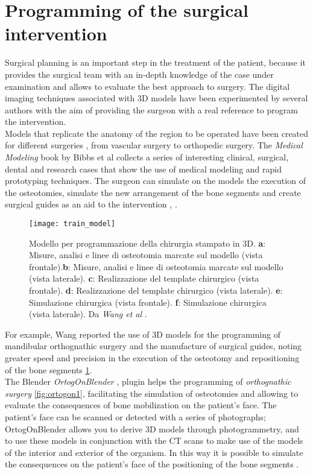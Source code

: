 \section{Programming of the surgical intervention}
Surgical planning is an important step in the treatment of the patient, because it provides the surgical team with an in-depth knowledge of the case under examination and allows to evaluate the best approach to surgery. The digital imaging techniques associated with 3D models have been experimented by several authors with the aim of providing the surgeon with a real reference to program the intervention. \\ Models that replicate the anatomy of the region to be operated have been created for different surgeries , from vascular surgery to orthopedic surgery. The \emph{Medical Modeling} book by Bibbs et al \parencite{Reference1} collects a series of interesting clinical, surgical, dental and research cases that show the use of medical modeling and rapid prototyping techniques. The surgeon can simulate on the models the execution of the osteotomies, simulate the new arrangement of the bone segments and create surgical guides as an aid to the intervention \parencite{Reference77}, \parencite{Reference78}.
\begin{figure}[h]
\vspace{-10pt}
	\begin{center}
	\texttt{[image: train\_model]}
    \caption{Modello per programmazione della chirurgia stampato in 3D.
\textbf{a}: Misure, analisi e linee di osteotomia marcate sul modello (vista frontale).\textbf{b}: Misure, analisi e linee di osteotomia marcate sul modello (vista laterale). \textbf{c}: Realizzazione del template chirurgico (vista frontale). \textbf{d}: Realizzazione del template chirurgico (vista laterale). \textbf{e}: Simulazione chirurgica (vista frontale). \textbf{f}: Simulazione chirurgica (vista laterale). Da \emph{Wang et al} \parencite{Reference20}.}
    \label{fig:train_model}
    \end{center}
\vspace{-20pt}
\end{figure}

For example, Wang \parencite{Reference109} reported the use of 3D models for the programming of mandibular orthognathic surgery and the manufacture of surgical guides, noting greater speed and precision in the execution of the osteotomy and repositioning of the bone segments \ref{fig:train_model}. \\
The Blender \emph{OrtogOnBlender} \parencite{Reference64}, \parencite{Reference79} plugin helps the programming of \emph{orthognathic surgery} \ref{fig:ortogon1}, facilitating the simulation of osteotomies and allowing to evaluate the consequences of bone mobilization on the patient's face. The patient's face can be scanned or detected with a series of photographs; OrtogOnBlender allows you to derive 3D models through photogrammetry, and to use these models in conjunction with the CT scans to make use of the models of the interior and exterior of the organism. In this way it is possible to simulate the consequences on the patient's face of the positioning of the bone segments \parencite{Reference145}.


